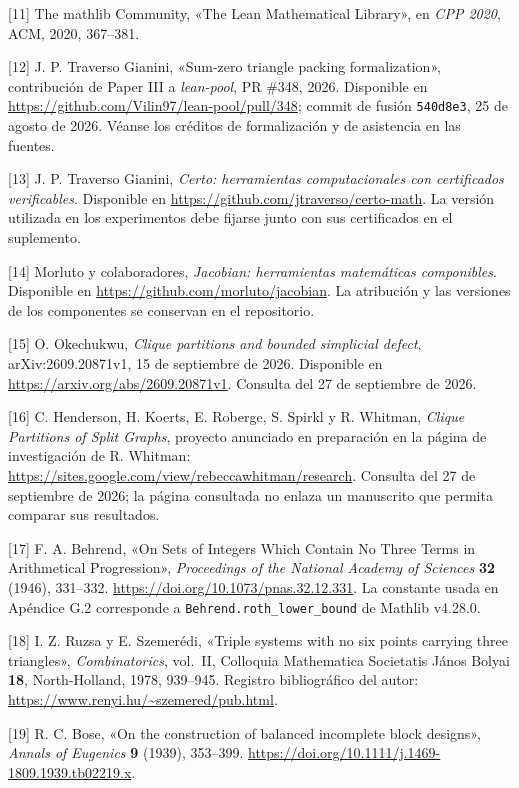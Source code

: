 \documentclass[spanish,11pt,a4paper]{article}
\begin{document}
{[}11{]} The mathlib Community, «The Lean Mathematical Library», en
\emph{CPP 2020}, ACM, 2020, 367--381.

{[}12{]} J. P. Traverso Gianini, «Sum-zero triangle packing
formalization», contribución de Paper III a \emph{lean-pool}, PR \#348,
2026. Disponible en \url{https://github.com/Vilin97/lean-pool/pull/348};
commit de fusión \nolinkurl{540d8e3}, 25 de agosto de 2026. Véanse los
créditos de formalización y de asistencia en las fuentes.

{[}13{]} J. P. Traverso Gianini, \emph{Certo: herramientas
computacionales con certificados verificables}. Disponible en
\url{https://github.com/jtraverso/certo-math}. La versión utilizada en
los experimentos debe fijarse junto con sus certificados en el
suplemento.

{[}14{]} Morluto y colaboradores, \emph{Jacobian: herramientas
matemáticas componibles}. Disponible en
\url{https://github.com/morluto/jacobian}. La atribución y las versiones
de los componentes se conservan en el repositorio.

{[}15{]} O. Okechukwu, \emph{Clique partitions and bounded simplicial
defect}, arXiv:2609.20871v1, 15 de septiembre de 2026. Disponible en
\url{https://arxiv.org/abs/2609.20871v1}. Consulta del 27 de septiembre
de 2026.

{[}16{]} C. Henderson, H. Koerts, E. Roberge, S. Spirkl y R. Whitman,
\emph{Clique Partitions of Split Graphs}, proyecto anunciado en
preparación en la página de investigación de R. Whitman:
\url{https://sites.google.com/view/rebeccawhitman/research}. Consulta
del 27 de septiembre de 2026; la página consultada no enlaza un
manuscrito que permita comparar sus resultados.

{[}17{]} F. A. Behrend, «On Sets of Integers Which Contain No Three
Terms in Arithmetical Progression», \emph{Proceedings of the National
Academy of Sciences} \textbf{32} (1946), 331--332.
\url{https://doi.org/10.1073/pnas.32.12.331}. La constante usada en
Apéndice G.2 corresponde a \nolinkurl{Behrend.roth_lower_bound} de
Mathlib v4.28.0.

{[}18{]} I. Z. Ruzsa y E. Szemerédi, «Triple systems with no six points
carrying three triangles», \emph{Combinatorics}, vol.~II, Colloquia
Mathematica Societatis János Bolyai \textbf{18}, North-Holland, 1978,
939--945. Registro bibliográfico del autor:
\url{https://www.renyi.hu/~szemered/pub.html}.

{[}19{]} R. C. Bose, «On the construction of balanced incomplete block
designs», \emph{Annals of Eugenics} \textbf{9} (1939), 353--399.
\url{https://doi.org/10.1111/j.1469-1809.1939.tb02219.x}.
\end{document}
